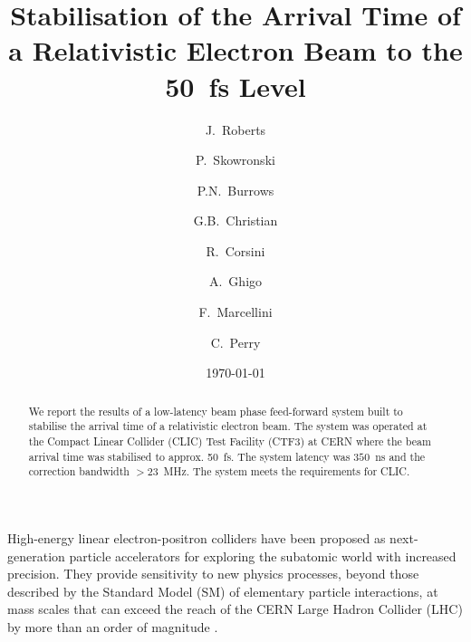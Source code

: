 \documentclass[%
 reprint,
 superscriptaddress,
 amsmath,
 amssymb,
 prl,
]{revtex4-1}
\begin{document}
\title{Stabilisation of the Arrival Time of a Relativistic Electron Beam to 
the 50~fs Level}

\author{J.~Roberts}

\author{P.~Skowronski}

\author{P.N.~Burrows}

\author{G.B.~Christian}

\author{R.~Corsini}

\author{A.~Ghigo}

\author{F.~Marcellini}

\author{C.~Perry}


\date{\today}

\begin{abstract}
We report the results of a low-latency beam phase feed-forward system built to 
stabilise the arrival time of a relativistic electron beam. The system was 
operated at the Compact Linear Collider (CLIC) Test Facility (CTF3) at CERN 
where the beam arrival time was stabilised to approx. 50~fs. The system 
latency was \(350\)~ns and the correction bandwidth \(>23\)~MHz. 
The system meets the requirements for CLIC.
\end{abstract}

\maketitle

High-energy linear electron-positron colliders have been proposed as 
next-generation particle accelerators for exploring the subatomic world with 
increased precision. They provide sensitivity to new physics processes, 
beyond those described by the Standard Model (SM) of elementary particle 
interactions, at mass scales that can exceed the reach of the CERN 
Large Hadron Collider (LHC) by more than an order of magnitude 
\cite{CLIC-staging}.
\end{document}
